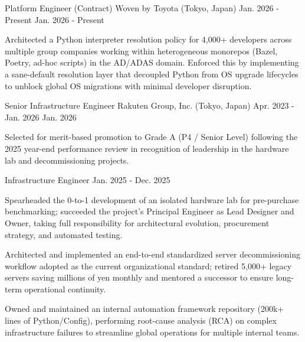 

\begin{cventries}

    \cventry
    {Platform Engineer (Contract)} %
    {Woven by Toyota (Tokyo, Japan)} %
    {Jan. 2026 - Present} %
    {Jan. 2026 - Present} %
    { 
      \begin{cvitems}
        \item {Architected a Python interpreter resolution policy for 4,000+ developers across multiple group companies working within heterogeneous monorepos (Bazel, Poetry, ad-hoc scripts) in the AD/ADAS domain. Enforced this by implementing a sane-default resolution layer that decoupled Python from OS upgrade lifecycles to unblock global OS migrations with minimal developer disruption.}
      \end{cvitems}
    }

  \cventry
    {Senior Infrastructure Engineer} %
    {Rakuten Group, Inc. (Tokyo, Japan)} %
    {Apr. 2023 - Jan. 2026} %
    {Jan. 2026} %
    {
      \begin{cvitems}
        \item {Selected for merit-based promotion to Grade A (P4 / Senior Level) following the 2025 year-end performance review in recognition of leadership in the hardware lab and decommissioning projects.}
      \end{cvitems}
    }
  
  \cventry
    {Infrastructure Engineer} %
    {} %
    {} %
    {Jan. 2025 - Dec. 2025} %
    {
      \begin{cvitems}
        \item {Spearheaded the 0-to-1 development of an isolated hardware lab for pre-purchase benchmarking; 
        succeeded the project's Principal Engineer as Lead Designer and Owner,
        taking full responsibility for architectural evolution, procurement strategy, and automated testing.}
        \item {Architected and implemented an end-to-end standardized server decommissioning workflow adopted as the current organizational standard;
        retired 5,000+ legacy servers saving millions of yen monthly and mentored a successor to ensure long-term operational continuity.}
        \item {Owned and maintained an internal automation framework repository  (200k+ lines of Python/Config),
        performing root-cause analysis (RCA) on complex infrastructure failures to streamline global operations for multiple internal teams.}
      \end{cvitems}
    }
  

\end{cventries}

